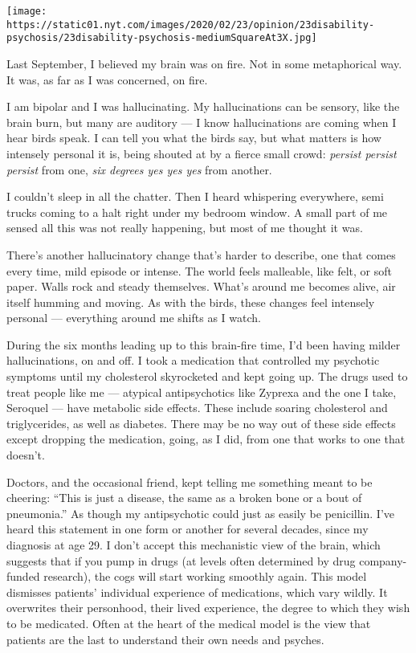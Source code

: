 \texttt{[image: https://static01.nyt.com/images/2020/02/23/opinion/23disability-psychosis/23disability-psychosis-mediumSquareAt3X.jpg]}

Last September, I believed my brain was on fire. Not in some
metaphorical way. It was, as far as I was concerned, on fire.

I am bipolar and I was hallucinating. My hallucinations can be sensory,
like the brain burn, but many are auditory --- I know hallucinations are
coming when I hear birds speak. I can tell you what the birds say, but
what matters is how intensely personal it is, being shouted at by a
fierce small crowd: \emph{persist persist persist} from one, \emph{six
degrees yes yes yes} from another.

I couldn't sleep in all the chatter. Then I heard whispering everywhere,
semi trucks coming to a halt right under my bedroom window. A small part
of me sensed all this was not really happening, but most of me thought
it was.

There's another hallucinatory change that's harder to describe, one that
comes every time, mild episode or intense. The world feels malleable,
like felt, or soft paper. Walls rock and steady themselves. What's
around me becomes alive, air itself humming and moving. As with the
birds, these changes feel intensely personal --- everything around me
shifts as I watch.

During the six months leading up to this brain-fire time, I'd been
having milder hallucinations, on and off. I took a medication that
controlled my psychotic symptoms until my cholesterol skyrocketed and
kept going up. The drugs used to treat people like me --- atypical
antipsychotics like Zyprexa and the one I take, Seroquel --- have
metabolic side effects. These include soaring cholesterol and
triglycerides, as well as diabetes. There may be no way out of these
side effects except dropping the medication, going, as I did, from one
that works to one that doesn't.

Doctors, and the occasional friend, kept telling me something meant to
be cheering: ``This is just a disease, the same as a broken bone or a
bout of pneumonia.'' As though my antipsychotic could just as easily be
penicillin. I've heard this statement in one form or another for several
decades, since my diagnosis at age 29. I don't accept this mechanistic
view of the brain, which suggests that if you pump in drugs (at levels
often determined by drug company-funded research), the cogs will start
working smoothly again. This model dismisses patients' individual
experience of medications, which vary wildly. It overwrites their
personhood, their lived experience, the degree to which they wish to be
medicated. Often at the heart of the medical model is the view that
patients are the last to understand their own needs and psyches.

